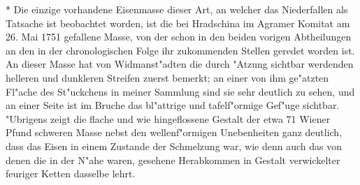 \documentclass[a4paper, 11pt, oneside, polutonikogreek, german]{article}
\begin{document}
* Die einzige vorhandene Eisenmasse dieser Art, an welcher das Niederfallen als Tatsache ist beobachtet worden, ist die bei Hradschina im Agramer Komitat am 26. Mai 1751 gefallene Masse, von der schon in den beiden vorigen Abtheilungen an den in der chronologischen Folge ihr zukommenden Stellen geredet worden ist. An dieser Masse hat von Widmanst"adten die durch "Atzung sichtbar werdenden helleren und dunkleren Streifen zuerst bemerkt; an einer von ihm ge"atzten Fl"ache des St"uckchens in meiner Sammlung sind sie sehr deutlich zu sehen, und an einer Seite ist im Bruche das bl"attrige und tafelf"ormige Gef"uge sichtbar. "Ubrigens zeigt die flache und wie hingeflossene Gestalt der etwa 71 Wiener Pfund schweren Masse nebst den wellenf"ormigen Unebenheiten ganz deutlich, dass das Eisen in einem Zustande der Schmelzung war, wie denn auch das von denen die in der N"ahe waren, gesehene Herabkommen in Gestalt verwickelter feuriger Ketten dasselbe lehrt.
\end{document}
